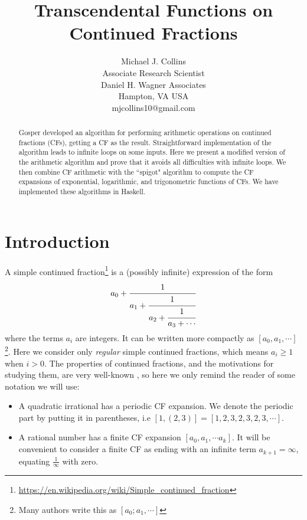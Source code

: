 \documentclass[11pt, oneside]{amsart}   	%
\title{Transcendental Functions on Continued Fractions}
\author{Michael J. Collins\\Associate Research Scientist\\Daniel H. Wagner Associates\\Hampton, VA USA\\mjcollins10@gmail.com}
\renewcommand{\:}{\negthickspace:\negthickspace}
\begin{document}
\begin{abstract}
Gosper  developed an algorithm for performing arithmetic operations on continued fractions (CFs), getting a CF as the result. Straightforward implementation of the algorithm leads to infinite loops on some inputs.
Here we present a modified version of the arithmetic algorithm and prove that it avoids all difficulties with infinite loops.
We then combine CF arithmetic with the ``spigot" algorithm to compute the CF expansions of exponential, logarithmic, and trigonometric functions of CFs.
We have implemented these algorithms in Haskell.
\end{abstract}

\maketitle

\section{Introduction}
A simple continued fraction\footnote{\href{https://en.wikipedia.org/wiki/Simple\_continued\_fraction}{https://en.wikipedia.org/wiki/Simple\_continued\_fraction}} is a (possibly infinite) expression of the form
\begin{equation*}
a_0+\cfrac{1}{a_1+\cfrac{1}{a_2+\cfrac{1}{a_3+\cdots}}}
\end{equation*}
where the terms $a_i$ are integers. It can be written more compactly as $[a_0, a_1, \cdots]$\footnote{Many authors write this as $[a_0; a_1, \cdots]$}. Here we consider only \emph{regular} simple continued fractions, which means $a_i \geq 1$ when $i>0$. The
properties of continued fractions, and the motivations for studying them, are very well-known \cite{rockett1992continued},
so here we only remind the reader of some notation we will use:
\begin{itemize}
\item A quadratic irrational has a periodic CF expansion. We denote the periodic part by putting it in parentheses,
i.e $[1,(2,3)] = [1,2,3,2,3,2,3,\cdots]$.
\item A rational number has a finite CF expansion $[a_0,a_1, \cdots a_k]$.
It will be convenient to consider a finite CF as ending with an infinite term $a_{k+1}=\infty$, equating $\frac{1}{\infty}$ with zero.
\end{itemize}
 
\end{document}
